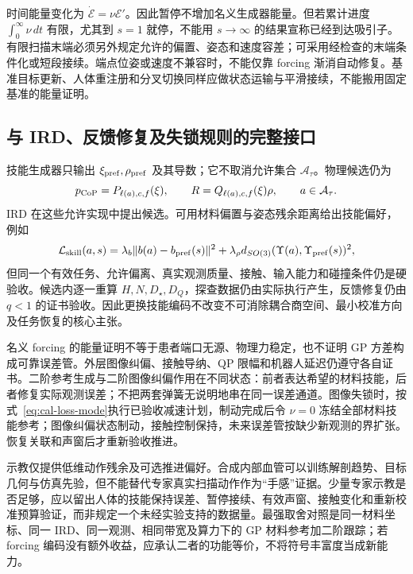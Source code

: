 \documentclass[11pt,a4paper]{article}
\numberwithin{equation}{section}
\theoremstyle{definition}
\begin{document}
时间能量变化为 $\dot{\mathcal E}=\nu\mathcal E'$。因此暂停不增加名义生成器能量。但若累计进度 $\int_0^\infty\nu\,dt$ 有限，尤其到 $s=1$ 就停，不能用 $s\to\infty$ 的结果宣称已经到达吸引子。有限扫描末端必须另外规定允许的偏置、姿态和速度容差；可采用经检查的末端条件化或短段接续。端点位姿或速度不兼容时，不能仅靠 forcing 渐消自动修复。基准目标更新、人体重注册和分叉切换同样应做状态运输与平滑接续，不能搬用固定基准的能量证明。

\subsection{与 IRD、反馈修复及失锁规则的完整接口}
技能生成器只输出 $\xi_{\rm pref},\rho_{\rm pref}$ 及其导数；它不取消允许集合 $\mathcal A_\tau$。物理候选仍为
\begin{equation}
 p_{\rm CoP}=P_{\ell(a),c,f}(\xi),\qquad
 R=Q_{\ell(a),c,f}(\xi)\rho,\qquad a\in\mathcal A_\tau.
\end{equation}
IRD 在这些允许实现中提出候选。可用材料偏置与姿态残余距离给出技能偏好，例如
\begin{equation}
 \mathcal L_{\rm skill}(a,s)=
 \lambda_b\|b(a)-b_{\rm pref}(s)\|^2+
 \lambda_\rho d_{SO(3)}(\Upsilon(a),\Upsilon_{\rm pref}(s))^2,
 \label{eq:v43-skill-preference}
\end{equation}
但同一个有效任务、允许偏离、真实观测质量、接触、输入能力和碰撞条件仍是硬验收。候选内逐一重算 $H,N,D_\star,D_Q$，探查数据仍由实际执行产生，反馈修复仍由 $q<1$ 的证书验收。因此更换技能编码不改变不可消除耦合商空间、最小校准方向及任务恢复的核心主张。

名义 forcing 的能量证明不等于患者端口无源、物理力稳定，也不证明 GP 方差构成可靠误差管。外层图像纠偏、接触导纳、QP 限幅和机器人延迟仍遵守各自证书。二阶参考生成与二阶图像纠偏作用在不同状态：前者表达希望的材料技能，后者修复实际观测误差；不把两套弹簧无说明地串在同一误差通道。图像失锁时，按式~\eqref{eq:cal-loss-mode}执行已验收减速计划，制动完成后令 $\nu=0$ 冻结全部材料技能参考；图像纠偏状态制动，接触控制保持，未来误差管按缺少新观测的界扩张。恢复关联和声窗后才重新验收推进。

示教仅提供低维动作残余及可选推进偏好。合成内部血管可以训练解剖趋势、目标几何与仿真先验，但不能替代专家真实扫描动作作为“手感”证据。少量专家示教是否足够，应以留出人体的技能保持误差、暂停接续、有效声窗、接触变化和重新校准预算验证，而非规定一个未经实验支持的数据量。最强取舍对照是同一材料坐标、同一 IRD、同一观测、相同带宽及算力下的 GP 材料参考加二阶跟踪；若 forcing 编码没有额外收益，应承认二者的功能等价，不将符号丰富度当成新能力。
\end{document}
